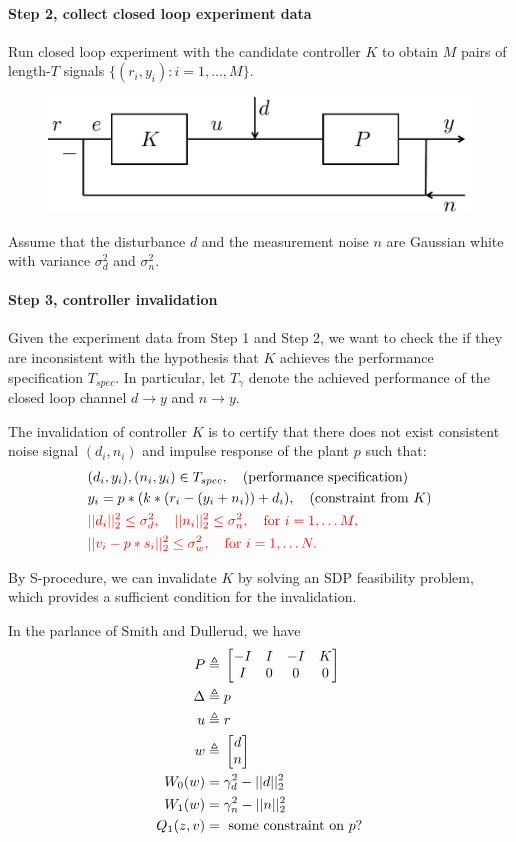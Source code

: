 \documentclass[11pt, onecolumn]{article}
\newcommand{\qq}[1]{{\color{magenta}{(#1)}}}
\newcommand{\rb}[1]{{\color{red}{ #1}}}
\begin{document}
\paragraph{Step 2,  collect closed  loop experiment data}
Run closed loop experiment with the candidate controller $K$ to obtain $M$ pairs of length-$T$ signals
$\{(r_i,y_i) : i=1,\dots, M\}$.
\begin{figure}[!ht]
  \centering
  \includegraphics[width=.5\linewidth]{sys2.pdf}
\end{figure}

\begin{assumption}
  Assume that the disturbance $d$ and the measurement noise $n$ are Gaussian white with variance
  $\sigma_d^2$ and $\sigma_n^2$.
\end{assumption}


\paragraph{Step 3, controller invalidation}
Given the experiment data from Step 1 and Step 2, we want to check the if they are inconsistent with
the hypothesis that $K$ achieves the performance specification $T_{spec}$.
%
In particular, let $T_{\gamma}$ denote the achieved performance of the closed loop channel $d\to y$
and $n\to y$.

The invalidation of controller $K$ is to certify that there does not exist consistent noise signal
$(d_i, n_i)$ and impulse response of the plant $p$ such that:
\begin{align*}
  & (d_i,y_i), (n_i,y_i)\in T_{spec}, \quad\tx{(performance specification)}
  \\
  & y_i = p * ( k* (r_i-(y_i+n_i)) +d_i), \quad\tx{(constraint from $K$)}
  \\
  & \rb{||d_i||_2^2\leq \sigma_d^2 , \quad ||n_i||_2^2\leq \sigma_n^2, \quad \tx{for }i=
  1,\dots M,}
  \\
  & \rb{||v_i - p*s_i||_2^2 \leq \sigma_w^2, \quad \tx{for }i= 1,\dots N.}
\end{align*}

By S-procedure, we can invalidate $K$ by solving an SDP feasibility problem, which provides
a sufficient condition for the invalidation.

\qq{Ross: make sure it is precise}
In the parlance of Smith and Dullerud, we have
\begin{align*}
P \triangleq &\; \begin{bmatrix}-I & I & -I & K\\I & 0 & 0 & 0\end{bmatrix}\\
\Delta \triangleq &\; p \\
u \triangleq &\; r \\
w \triangleq &\; \begin{bmatrix}d\\n\end{bmatrix}\\
W_0(w) = &\; \gamma_d^2 - ||d||_2^2\\
W_1(w) = &\; \gamma_n^2 - ||n||_2^2\\
Q_1(z,v) = &\; \text{ some constraint on $p$?}
\end{align*}
\end{document}
